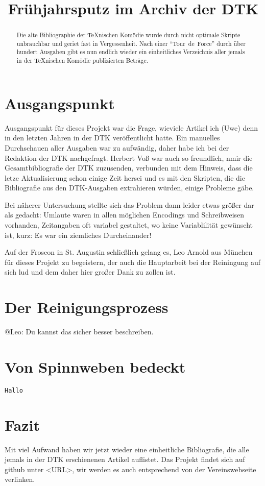 \documentclass[ngerman]{dtk}
\title{Frühjahrsputz im Archiv der DTK}
\begin{document}
\maketitle

\begin{abstract}
Die alte Bibliographie der \TeX{}nischen Komödie wurde durch nicht-optimale Skripte unbrauchbar und geriet fast in Vergessenheit. Nach einer \enquote{Tour~de~Force} durch über hundert Ausgaben gibt es nun endlich wieder ein einheitliches Verzeichnis aller jemals in der \TeX nischen Komödie publizierten Beträge.
\end{abstract} 

\section{Ausgangspunkt}

Ausgangspunkt für dieses Projekt war die Frage, wieviele Artikel ich (Uwe) denn in den letzten Jahren in der DTK veröffentlicht hatte. Ein manuelles Durchschauen aller Ausgaben war zu aufwändig, daher habe ich bei der Redaktion der DTK nachgefragt. Herbert Voß war auch so freundlich, nmir die Gesamtbibliografie der DTK zuzusenden, verbunden mit dem Hinweis, dass die letze Aktualisierung schon einige Zeit hersei und es mit den Skripten, die die Bibliografie aus den DTK-Ausgaben extrahieren würden, einige Probleme gäbe.

Bei näherer Untersuchung stellte sich das Problem dann leider etwas größer dar als gedacht: Umlaute waren in allen möglichen Encodings und Schreibweisen vorhanden, Zeitangaben oft variabel gestaltet, wo keine Variablilität gewünscht ist, kurz: Es war ein ziemliches Durcheinander!

Auf der Froscon in St. Augustin schließlich gelang es, Leo Arnold aus München für dieses Projekt zu begeistern, der auch die Hauptarbeit bei der Reiningung auf sich lud und dem daher hier großer Dank zu zollen ist. 

\section{Der Reinigungsprozess}

@Leo: Du kannst das sicher besser beschreiben.


\section{Von Spinnweben bedeckt}

\nocite{*}

\begin{lstlisting}
Hallo
\end{lstlisting}


\section{Fazit}

Mit viel Aufwand haben wir jetzt wieder eine einheitliche Bibliografie, die alle jemals in der DTK erschienenen Artikel auflistet. Das Projekt findet sich auf github unter <URL>, wir werden es auch entsprechend von der Vereinswebseite verlinken.

\printbibliography
\end{document}
